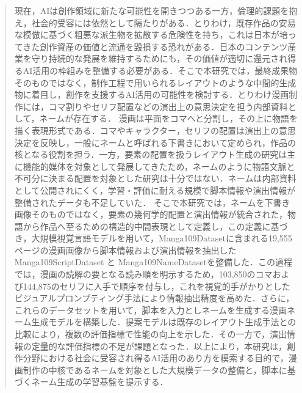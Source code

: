 \documentclass[a4j,10.5pt,dvipdfmx]{jsreport}
\begin{document}
\ifdefined\ismain\else
   \pagestyle{fancy}
   \lhead{\rightmark}
   \renewcommand{\chaptermark}[1]{\markboth{第\ \thechapter\ 章\ #1}{}}
   \setlength{\headheight}{16.5pt}
   \titleformat{\chapter}[hang]{\LARGE\bfseries}{\prechaptername\thechapter\postchaptername}{1em}{}
\fi

\begin{abstract}
   現在，AIは創作領域に新たな可能性を開きつつある一方，倫理的課題を抱え，社会的受容には依然として隔たりがある．とりわけ，既存作品の安易な模倣に基づく粗悪な派生物を拡散する危険性を持ち，これは日本が培ってきた創作資産の価値と流通を毀損する恐れがある．日本のコンテンツ産業を守り持続的な発展を維持するためにも，その価値が適切に還元され得るAI活用の枠組みを整備する必要がある．そこで本研究では，最終成果物そのものではなく，制作工程で用いられるレイアウトのような中間的生成物に着目し，創作を支援するAI活用の可能性を検討する．とりわけ漫画制作には，コマ割りやセリフ配置などの演出上の意思決定を担う内部資料として，ネームが存在する．
   漫画は平面をコマへと分割し，その上に物語を描く表現形式である．コマやキャラクター，セリフの配置は演出上の意思決定を反映し，一般にネームと呼ばれる下書きにおいて定められ，作品の核となる役割を担う．一方，要素の配置を扱うレイアウト生成の研究は主に機能的媒体を対象として発展してきたため，ネームのように物語文脈と不可分に決まる配置を対象とした研究は十分ではない．ネームは内部資料として公開されにくく，学習・評価に耐える規模で脚本情報や演出情報が整備されたデータも不足していた．
   そこで本研究では，ネームを下書き画像そのものではなく，要素の幾何学的配置と演出情報が統合された，物語から作品へ至るための構造的中間表現として定義し，この定義に基づき，大規模視覚言語モデルを用いて，Manga109Datasetに含まれる19,555ページの漫画画像から脚本情報および演出情報を抽出したManga109ScriptDataset と Manga109NameDatasetを整備した．この過程では，漫画の読解の要となる読み順を明示するため，103,850のコマおよび144,875のセリフに人手で順序を付与し，これを視覚的手がかりとしたビジュアルプロンプティング手法により情報抽出精度を高めた．さらに，これらのデータセットを用いて，脚本を入力としネームを生成する漫画ネーム生成モデルを構築した．提案モデルは既存のレイアウト生成手法との比較により，複数の評価指標で性能の向上を示した．その一方で，演出情報の定量的な評価指標の不足が課題となった．以上により，本研究は，創作分野における社会に受容され得るAI活用のあり方を模索する目的で，漫画制作の中核であるネームを対象とした大規模データの整備と，脚本に基づくネーム生成の学習基盤を提示する．
\end{abstract}
\end{document}
